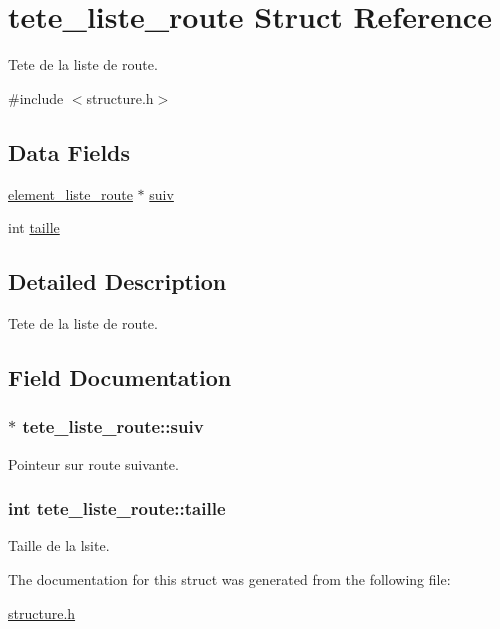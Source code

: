 \hypertarget{structtete__liste__route}{}\section{tete\+\_\+liste\+\_\+route Struct Reference}
\label{structtete__liste__route}


Tete de la liste de route.  




{\ttfamily \#include $<$structure.\+h$>$}

\subsection*{Data Fields}
\begin{DoxyCompactItemize}
\item 
\hyperlink{structelement__liste__route}{element\+\_\+liste\+\_\+route} $\ast$ \hyperlink{structtete__liste__route_af560830be8e736fec831f27f533ea971}{suiv}
\item 
int \hyperlink{structtete__liste__route_aba9c39db3144f191d58cd6e9d1a1ac23}{taille}
\end{DoxyCompactItemize}


\subsection{Detailed Description}
Tete de la liste de route. 

\subsection{Field Documentation}
\subsubsection[{\texorpdfstring{suiv}{suiv}}]{$\ast$ tete\+\_\+liste\+\_\+route\+::suiv}\hypertarget{structtete__liste__route_af560830be8e736fec831f27f533ea971}{}\label{structtete__liste__route_af560830be8e736fec831f27f533ea971}
Pointeur sur route suivante. 
\subsubsection[{\texorpdfstring{taille}{taille}}]{\setlength{\rightskip}{0pt plus 5cm}int tete\+\_\+liste\+\_\+route\+::taille}\hypertarget{structtete__liste__route_aba9c39db3144f191d58cd6e9d1a1ac23}{}\label{structtete__liste__route_aba9c39db3144f191d58cd6e9d1a1ac23}
Taille de la lsite. 

The documentation for this struct was generated from the following file\+:\begin{DoxyCompactItemize}
\item 
\hyperlink{structure_8h}{structure.\+h}\end{DoxyCompactItemize}
